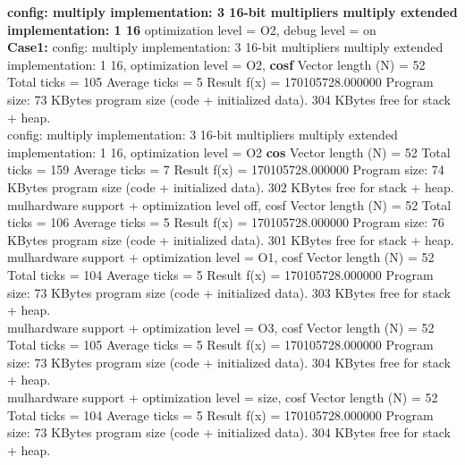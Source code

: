 \textbf{config: multiply implementation: 3 16-bit multipliers
        multiply extended implementation: 1 16}
        optimization level = O2, debug level = on
        \\
\textbf{Case1: }
config: multiply implementation: 3 16-bit multipliers
        multiply extended implementation: 1 16,
        optimization level = O2,
        \textbf{cosf}
Vector length (N)     = 52
Total ticks           = 105
Average ticks         = 5
Result f(x)           = 170105728.000000
Program size: 73 KBytes program size (code + initialized data).
              304 KBytes free for stack + heap.
\\
config: multiply implementation: 3 16-bit multipliers
        multiply extended implementation: 1 16,
        optimization level = O2
        \textbf{cos}
Vector length (N)     = 52
Total ticks           = 159
Average ticks         = 7
Result f(x)           = 170105728.000000
Program size: 74 KBytes program size (code + initialized data).
              302 KBytes free for stack + heap.
\\ 
mulhardware support + optimization level off, cosf
Vector length (N)     = 52
Total ticks           = 106
Average ticks         = 5
Result f(x)           = 170105728.000000
Program size: 76 KBytes program size (code + initialized data).
              301 KBytes free for stack + heap.
\\
mulhardware support + optimization level = O1, cosf
Vector length (N)     = 52
Total ticks           = 104
Average ticks         = 5
Result f(x)           = 170105728.000000
Program size: 73 KBytes program size (code + initialized data).
              303 KBytes free for stack + heap.
\\
mulhardware support + optimization level = O3, cosf
Vector length (N)     = 52
Total ticks           = 105
Average ticks         = 5
Result f(x)           = 170105728.000000
Program size: 73 KBytes program size (code + initialized data).
              304 KBytes free for stack + heap.
\\
mulhardware support + optimization level = size, cosf
Vector length (N)     = 52
Total ticks           = 104
Average ticks         = 5
Result f(x)           = 170105728.000000
Program size: 73 KBytes program size (code + initialized data).
              304 KBytes free for stack + heap.



